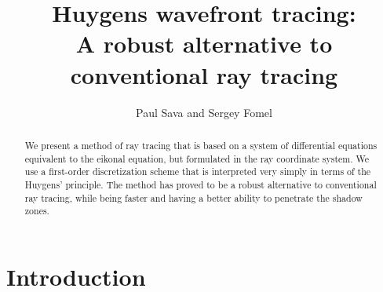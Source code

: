 \title{Huygens wavefront tracing: \\ A robust alternative to conventional
ray tracing}


\author{Paul Sava and Sergey Fomel}

\maketitle

\begin{abstract}
We present a method of ray tracing that is based on a system of
differential equations equivalent to the eikonal equation, but formulated
in the ray coordinate system. We use a first-order discretization scheme
that is interpreted very simply in terms of the Huygens' principle. The
method has proved to be a robust alternative to conventional ray tracing,
while being faster and having a better ability to penetrate the shadow
zones.
\end{abstract}

\section{Introduction}

